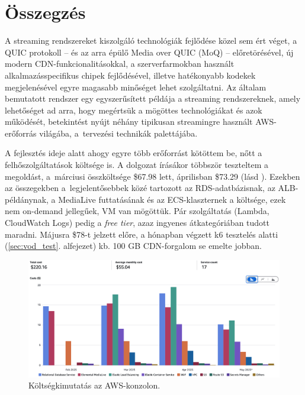 \chapter{Összegzés}

A streaming rendszereket kiszolgáló technológiák fejlődése közel sem ért véget, a QUIC protokoll -- és az arra épülő Media over QUIC\cite{ietf-moq-transport-11} (MoQ) -- előretörésével, új modern CDN-funkcionalitásokkal\cite{openconnect}, a szerverfarmokban használt alkalmazásspecifikus chipek fejlődésével, illetve hatékonyabb kodekek megjelenésével egyre magasabb minőséget lehet szolgáltatni. Az általam bemutatott rendszer egy egyszerűsített példája a streaming rendszereknek, amely lehetőséget ad arra, hogy megértsük a mögöttes technológiákat és azok működését, betekintést nyújt néhány tipikusan streamingre használt AWS-erőforrás világába, a~tervezési technikák palettájába.

A fejlesztés ideje alatt ahogy egyre több erőforrást kötöttem be, nőtt a felhőszolgáltatások költsége is. A dolgozat írásákor többször teszteltem a megoldást, a~márciusi összköltsége \$67.98 lett, áprilisban \$73.29 (lásd ). Ezekben az összegekben a~legjelentősebbek közé tartozott az RDS-adatbázisnak, az ALB-példánynak, a MediaLive futtatásának és az ECS-klaszternek a költsége, ezek nem on-demand jellegűek, VM van mögöttük. Pár szolgáltatás (Lambda, CloudWatch Logs) pedig a \emph{free tier}, azaz ingyenes átkategóriában tudott maradni. Májusra \$78-t jelzett előre, a hónapban végzett k6 tesztelés alatti (\ref{sec:vod_test}. alfejezet) kb. 100 GB CDN-forgalom se emelte jobban.

\begin{figure}[h]
  \centering
  \includegraphics[width=150mm, keepaspectratio]{figures/costs.png}
  \caption{Költségkimutatás az AWS-konzolon.}
  \label{fig:costs}
\end{figure}

